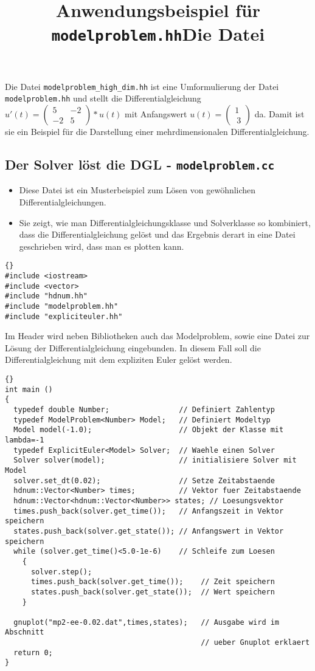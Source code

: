 \documentclass[a4paper,11pt]{article}
\theoremstyle{definition}
\begin{document}
\title{\textbf{Anwendungsbeispiel für \lstinline{modelproblem.hh}}}
Die Datei \lstinline{modelproblem_high_dim.hh} ist eine Umformulierung der Datei \lstinline{modelproblem.hh} und stellt die Differentialgleichung $u'(t) = \begin{pmatrix}
5 & -2\\
-2 & 5
\end{pmatrix}*u(t)$ mit Anfangswert $ u(t) = \left( \begin{array}{c}1 \\\ 3  \end{array}\right)$ da. Damit ist sie ein Beispiel für die Darstellung einer mehrdimensionalen Differentialgleichung.

\subsection{Der Solver löst die DGL - \lstinline{modelproblem.cc}}
\begin{itemize}
\item Diese Datei ist ein Musterbeispiel zum Lösen von gewöhnlichen Differentialgleichungen.
\item Sie zeigt, wie man Differentialgleichungsklasse und Solverklasse so kombiniert, dass die Differentialgleichung gelöst und das Ergebnis derart in eine Datei geschrieben wird, dass man es plotten kann.
\end{itemize}

\title{\textbf{Die Datei}}
{\footnotesize{\begin{lstlisting}{}
#include <iostream>
#include <vector>
#include "hdnum.hh"
#include "modelproblem.hh"
#include "expliciteuler.hh"
\end{lstlisting}}}
Im Header wird neben Bibliotheken auch das Modelproblem, sowie eine Datei zur Lösung der Differentialgleichung eingebunden. In diesem Fall soll die Differentialgleichung mit dem expliziten Euler gelöst werden.
{\footnotesize{\begin{lstlisting}{}
int main ()
{
  typedef double Number;                // Definiert Zahlentyp
  typedef ModelProblem<Number> Model;   // Definiert Modeltyp
  Model model(-1.0);                    // Objekt der Klasse mit lambda=-1
  typedef ExplicitEuler<Model> Solver;  // Waehle einen Solver
  Solver solver(model);                 // initialisiere Solver mit Model
  solver.set_dt(0.02);                  // Setze Zeitabstaende
  hdnum::Vector<Number> times;          // Vektor fuer Zeitabstaende
  hdnum::Vector<hdnum::Vector<Number>> states; // Loesungsvektor
  times.push_back(solver.get_time());   // Anfangszeit in Vektor speichern
  states.push_back(solver.get_state()); // Anfangswert in Vektor speichern
  while (solver.get_time()<5.0-1e-6)    // Schleife zum Loesen
    {
      solver.step();                    
      times.push_back(solver.get_time());    // Zeit speichern
      states.push_back(solver.get_state());  // Wert speichern
    }

  gnuplot("mp2-ee-0.02.dat",times,states);   // Ausgabe wird im Abschnitt
                                             // ueber Gnuplot erklaert
  return 0;
}

\end{lstlisting}}}
\end{document}
